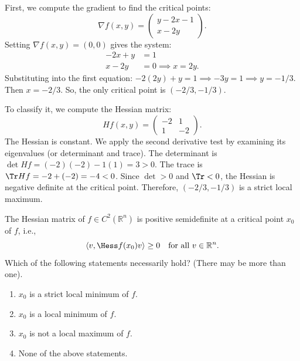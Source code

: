 \begin{exercisesolution}
First, we compute the gradient to find the critical points:
\[ \nabla f(x,y) = \begin{pmatrix} y - 2x - 1 \\ x - 2y \end{pmatrix}. \]
Setting $\nabla f(x,y) = (0,0)$ gives the system:
\begin{align*}
-2x + y &= 1 \\
x - 2y &= 0 \implies x = 2y.
\end{align*}
Substituting into the first equation: $-2(2y) + y = 1 \implies -3y = 1 \implies y = -1/3$.
Then $x = -2/3$. So, the only critical point is $(-2/3, -1/3)$.

To classify it, we compute the Hessian matrix:
\[ Hf(x,y) = \begin{pmatrix} -2 & 1 \\ 1 & -2 \end{pmatrix}. \]
The Hessian is constant. We apply the second derivative test by examining its eigenvalues (or determinant and trace).
The determinant is $\det Hf = (-2)(-2) - 1(1) = 3 > 0$. The trace is $\Tr Hf = -2 + (-2) = -4 < 0$.
Since $\det > 0$ and $\Tr < 0$, the Hessian is negative definite at the critical point.
Therefore, $(-2/3, -1/3)$ is a strict local maximum.
\end{exercisesolution}


\begin{exercise}
\label{ex:semidefinite_hessian_multiple_choice}
The Hessian matrix of $f \in C^2(\mathbb{R}^n)$ is positive semidefinite at a critical point $x_0$
of $f$, i.e.,
\[\langle v, \Hess f(x_0) v\rangle \geq 0 \quad \text{for all } v \in \mathbb{R}^n.\]
Which of the following statements necessarily hold? (There may be more than one).
\begin{enumerate}[label=\textbf{(\alph*)}]
  \item $x_0$ is a strict local minimum of $f$.
  \item $x_0$ is a local minimum of $f$.
  \item $x_0$ is not a local maximum of $f$.
  \item None of the above statements.
\end{enumerate}
\end{exercise}

